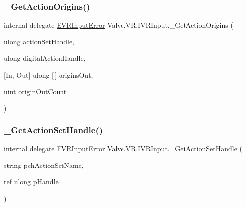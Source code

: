 \mbox{\label{struct_valve_1_1_v_r_1_1_i_v_r_input_a07748e313f1d66ea8b3455c15b5a35fe}} 
\subsubsection{\texorpdfstring{\_GetActionOrigins()}{\_GetActionOrigins()}}
{\footnotesize\ttfamily internal delegate \mbox{\hyperlink{namespace_valve_1_1_v_r_a592d7f4189b8346d6c96dbdbaa35bc1b}{E\+V\+R\+Input\+Error}} Valve.\+V\+R.\+I\+V\+R\+Input.\+\_\+\+Get\+Action\+Origins (\begin{DoxyParamCaption}\item[{ulong}]{action\+Set\+Handle,  }\item[{ulong}]{digital\+Action\+Handle,  }\item[{\mbox{[}\+In, Out\mbox{]} ulong \mbox{[}$\,$\mbox{]}}]{origins\+Out,  }\item[{uint}]{origin\+Out\+Count }\end{DoxyParamCaption})}

\mbox{\label{struct_valve_1_1_v_r_1_1_i_v_r_input_ab3c6223a018a82a60946167267376579}} 
\subsubsection{\texorpdfstring{\_GetActionSetHandle()}{\_GetActionSetHandle()}}
{\footnotesize\ttfamily internal delegate \mbox{\hyperlink{namespace_valve_1_1_v_r_a592d7f4189b8346d6c96dbdbaa35bc1b}{E\+V\+R\+Input\+Error}} Valve.\+V\+R.\+I\+V\+R\+Input.\+\_\+\+Get\+Action\+Set\+Handle (\begin{DoxyParamCaption}\item[{string}]{pch\+Action\+Set\+Name,  }\item[{ref ulong}]{p\+Handle }\end{DoxyParamCaption})}

\mbox{\label{struct_valve_1_1_v_r_1_1_i_v_r_input_a3e6eea8d879b201cac5deced936b5298}} 
